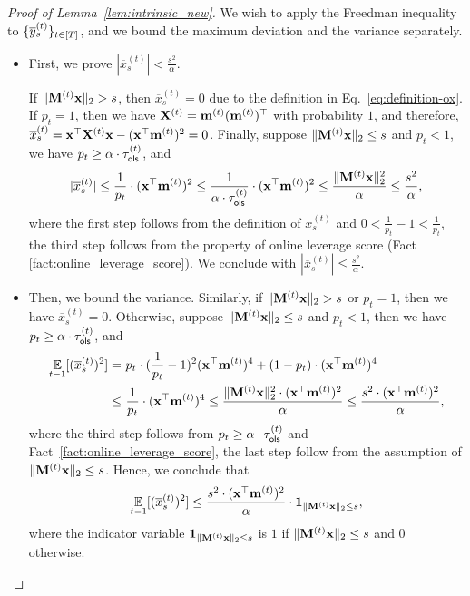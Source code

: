 \begin{proof}[Proof of Lemma~\ref{lem:intrinsic_new}]
We wish to apply the Freedman inequality to $\{\overline{y}_s^{(t)}\}_{t \in [T]}$, and we bound the maximum deviation and the variance separately.
\begin{itemize}
\item First, we prove $|\overline{x}_s^{(t)}| < \frac{s^2}{\alpha}$. 

If $\|\mathbf{M}^{(t)} \mathbf{x}\|_2 > s$, then  $\overline{x}_s^{(t)} = 0$ due to the definition in Eq.~\eqref{eq:definition-ox}.
If $p_t = 1$, then we have $\mathbf{X}^{(t)} = \mathbf{m}^{(t)} (\mathbf{m}^{(t)})^{\top}$ with probability $1$, and therefore, $\overline{x}_s^{(t)} = \mathbf{x}^{\top} \mathbf{X}^{(t)} \mathbf{x} - (\mathbf{x}^{\top} \mathbf{m}^{(t)})^2 = 0$.
Finally, suppose $\|\mathbf{M}^{(t)} \mathbf{x}\|_2 \leq s$ and $p_t < 1$, we have $p_t \geq \alpha \cdot \tau_{\mathsf{ols}}^{(t)}$, and
\begin{align*}
|\overline{x}_s^{(t)}| \leq \frac{1}{p_t} \cdot (\mathbf{x}^{\top} \mathbf{m}^{(t)})^2 \leq \frac{1}{\alpha \cdot \tau_{\mathsf{ols}}^{(t)}} \cdot (\mathbf{x}^{\top} \mathbf{m}^{(t)})^2 
\leq \frac{\|\mathbf{M}^{(t)} \mathbf{x}\|_2^2}{\alpha} \leq \frac{s^2}{\alpha},
\end{align*}
where the first step follows from the definition of $\overline{x}_s^{(t)}$ and $0 < \frac{1}{p_t} - 1 < \frac{1}{p_t}$, the third step follows from the property of online leverage score (Fact \ref{fact:online_leverage_score}).
We conclude with $|\overline{x}_s^{(t)}| \leq \frac{s^2}{\alpha}$.

\item Then, we bound the variance. Similarly, if $\|\mathbf{M}^{(t)} \mathbf{x}\|_2 > s$ or $p_t = 1$, then we have $\overline{x}_s^{(t)} = 0$.
Otherwise, suppose $\|\mathbf{M}^{(t)} \mathbf{x}\|_2 \leq s$ and $p_t < 1$, then we have $p_t \geq \alpha \cdot \tau_{\mathsf{ols}}^{(t)}$, and
\begin{align*}
\operatorname*{{\mathbb{E}}}_{t-1}[(\overline{x}_s^{(t)})^2] = &~ p_t \cdot (\frac{1}{p_t}-1)^2 (\mathbf{x}^{\top} \mathbf{m}^{(t)})^4 + (1 - p_t) \cdot (\mathbf{x}^{\top} \mathbf{m}^{(t)})^4 \\
\leq &~ \frac{1}{p_t} \cdot (\mathbf{x}^{\top} \mathbf{m}^{(t)})^4 
\leq \frac{\|\mathbf{M}^{(t)} \mathbf{x}\|_2^2 \cdot (\mathbf{x}^{\top} \mathbf{m}^{(t)})^2}{\alpha} \leq \frac{s^2 \cdot (\mathbf{x}^{\top} \mathbf{m}^{(t)})^2}{\alpha},
\end{align*}
where the third step follows from $p_t \geq \alpha \cdot \tau_{\mathsf{ols}}^{(t)}$ and Fact~\ref{fact:online_leverage_score}, the last step follow from the assumption of $\|\mathbf{M}^{(t)} \mathbf{x}\|_2 \leq s$.
Hence, we conclude that
\[
\operatorname*{{\mathbb{E}}}_{t-1}[(\overline{x}_s^{(t)})^2] \leq \frac{s^2 \cdot (\mathbf{x}^{\top} \mathbf{m}^{(t)})^2}{\alpha} \cdot \mathbf{1}_{\|\mathbf{M}^{(t)} \mathbf{x}\|_2 \leq s},
\] 
where the indicator variable $\mathbf{1}_{\|\mathbf{M}^{(t)} \mathbf{x}\|_2 \leq s}$ is $1$ if $\|\mathbf{M}^{(t)} \mathbf{x}\|_2 \leq s$ and $0$ otherwise.


\end{itemize}
\end{proof}
